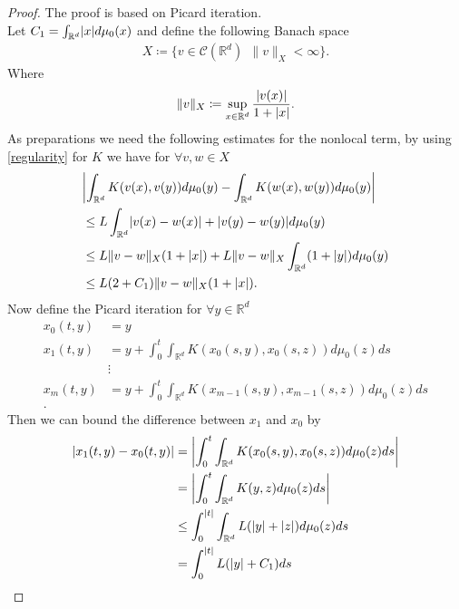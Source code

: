 \begin{proof}
  The proof is based on Picard iteration. \\[1ex] 
  Let $C_1 = \int_{\mathbb{R}^{d} } \lvert x\rvert d\mu_0(x)$ and define the following Banach space 
  \begin{align*}
    X \coloneqq  \{v \in  \mathcal{C}(\mathbb{R}^{d}) \: \ \|v\|_{X} < \infty\}  
  .\end{align*}
  Where 
  \begin{align*}
    \|v\|_X \coloneqq \sup_{x \in  \mathbb{R}^{d} } \frac{\lvert v(x)\rvert}{1+\lvert x\rvert}
  .\end{align*}
  As preparations we need the following estimates for the nonlocal term, by using \autoref{regularity} for $K$
  we have for $\forall  v , w \in  X$ 
  \begin{align*}
    &\abs*{\int_{\mathbb{R}^{d} }K(v(x),v(y)) d\mu_0(y) - \int_{\mathbb{R}^{d} }K(w(x),w(y)) d\mu_0(y)}\\
    &\le L \int_{\mathbb{R}^{d} } \abs{v(x)-w(x)} + \abs{v(y) - w(y)} d\mu_0(y)\\
    &\le  L \|v-w\|_{X}(1+\abs{x}) + L \|v-w\|_{X} \int_{\mathbb{R}^{d} } (1+\abs{y}) d\mu_0(y) \\
    &\le  L(2+C_{1})\|v - w\|_X (1+\abs{x})
  .\end{align*}
  Now define the Picard iteration for $\forall  y \in  \mathbb{R}^{d} $
  \begin{align*}
    x_0(t,y) &= y \\
    x_1(t,y) &= y + \int_0^{t} \int_{\mathbb{R}^{d}} K(x_{0}(s,y),x_0(s,z))d\mu_0(z)ds\\
             &\vdots \\
    x_m(t,y) &= y + \int_0^{t} \int_{\mathbb{R}^{d}} K(x_{m-1}(s,y),x_{m-1}(s,z))d\mu_0(z)ds\\
  .\end{align*}
  Then we can bound the difference between $x_{1}$ and $x_{0}$ by 
  \begin{align*}
    \abs{x_1(t,y) - x_{0}(t,y)} &= \abs*{\int_0^{t} \int_{\mathbb{R}^{d} }  K(x_{0}(s,y),x_{0}(s,z)) d\mu_0(z) ds} \\
                                &= \abs*{\int_0^{t} \int_{\mathbb{R}^{d} } K(y,z) d\mu_0(z) ds}\\
                                &\le \int_0^{\abs{t}}  \int_{\mathbb{R}^{d} }L(\abs{y} + \abs{z}) d\mu_0(z)ds\\
                                &= \int_0^{\abs{t}}  L(\abs{y} + C_1) ds \\

\end{align*}
\end{proof}
